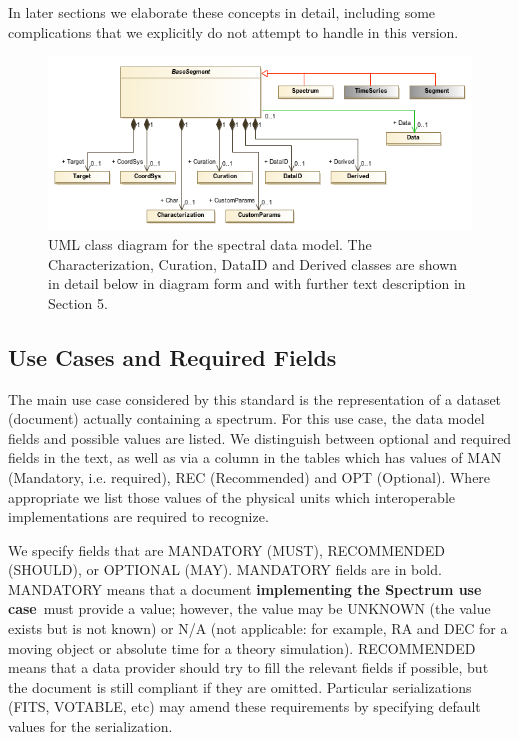 \documentclass[11pt]{article}
\begin{document}
\vskip 0.1in

In later sections we elaborate these concepts in detail, including some
complications that we explicitly do not attempt to handle in this
version.

\begin{figure}[h]
  \begin{center}
    \includegraphics[width=\textwidth]{diagrams/spectrum.png}
    \caption{UML class diagram for the spectral data model.  The Characterization, Curation, DataID and Derived classes are shown in
      detail below in diagram form and with further text description in Section 5.
    }
  \end{center}
\end{figure}

\subsection{Use Cases and Required Fields}

The main use case considered by this standard is the representation
of a dataset (document) actually containing a spectrum. 
For this use case,
the data model fields and possible values
are listed. 
We distinguish between optional and required fields in the
text, as well as via a 
column in the tables which has values of MAN (Mandatory, i.e. required),
REC (Recommended) and OPT (Optional).
Where appropriate we list those values of the physical units which interoperable
implementations are required to recognize.

We specify fields that are MANDATORY (MUST), RECOMMENDED (SHOULD), or
OPTIONAL (MAY). MANDATORY fields are in bold. MANDATORY means that a
document {\bf implementing the Spectrum use case}~must provide a value; however, the value may be UNKNOWN (the
value exists but is not known) or N/A (not applicable: for example, RA
and DEC for a moving object or absolute time for a theory simulation).
RECOMMENDED means that a data provider should try to fill the relevant
fields if possible, but the document is still compliant if they are
omitted. Particular serializations (FITS, VOTABLE, etc) may 
amend these requirements by specifying default values for the
serialization. 
\end{document}
